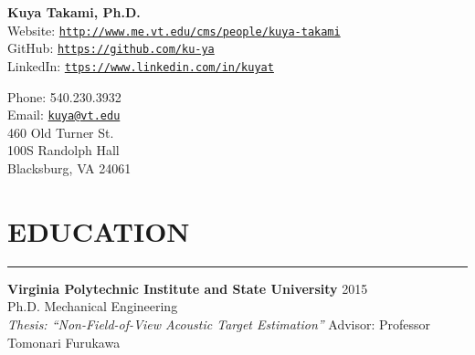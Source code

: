 \documentclass[11pt,letterpaper]{article}
\def\name{\bf Kuya Takami, Ph.D.}
\begin{document}
\rhead{}
\begin{minipage}{0.7\linewidth}
{\Huge \name}\\

\vspace{5mm}\hspace{4mm}
Website:  \href{http://www.me.vt.edu/cms/people/kuya-takami}{\tt http://www.me.vt.edu/cms/people/kuya-takami} \\
\hspace{4mm}
GitHub: \href{https://github.com/ku-ya}{\tt https://github.com/ku-ya}\\
\hspace{4mm}
LinkedIn:  \href{https://www.linkedin.com/in/kuyat}{\tt ttps://www.linkedin.com/in/kuyat} \\
\end{minipage}
\hspace{2mm}
\begin{minipage}{0.6\linewidth} 
      Phone:  540.230.3932\\
	Email:  \href{mailto:kuya@vt.edu}{\tt kuya@vt.edu} \\
    460 Old Turner St.\\
  100S Randolph Hall\\
   Blacksburg, VA 24061\\
\end{minipage}

\section*{EDUCATION}\vspace{-3mm}
\hrule
\begin{minipage}{\columnwidth}
{\bf Virginia Polytechnic Institute and State University}\hspace{1mm} 2015\\
\hspace{5mm}Ph.D.  Mechanical Engineering   \\
\hspace{10mm}
{\it Thesis: ``Non-Field-of-View Acoustic Target Estimation''} Advisor: Professor Tomonari Furukawa
\end{minipage}
\end{document}
